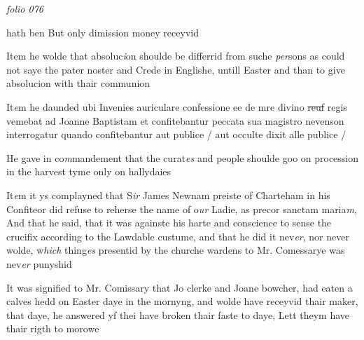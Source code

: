 \documentclass[12pt, a4paper]{book}
\begin{document}
\textit{folio 076}



	
		\ifthenelse{\isodd{\thepage}}
		{\reversemarginpar}
		{\normalmarginpar}
		hath ben But only dimission money receyvid
	
		\ifthenelse{\isodd{\thepage}}
		{\reversemarginpar}
		{\normalmarginpar}
		Item he wolde that absoluc\textit{i}on shoulde be differrid from
 suche \textit{per}sons as could not saye the pater noster and
 Crede in Englishe, untill Easter and than to give
 absolucion with thair communion


	
				\marginpar[\vspace{0.5cm}{\textcolor{Gray}{Confession}}]{}
			
	
		\ifthenelse{\isodd{\thepage}}
		{\reversemarginpar}
		{\normalmarginpar}
		It\textit{e}m he daunded ubi Invenies auriculare confessione
 ee de mre divino \sout{reuf} regis
			 vemebat ad Joanne Baptistam
 et confitebantur peccata sua magistro nevenson interrogatur
 quando confitebantur aut publice / aut occulte dixit
 alle publice /


	
		\ifthenelse{\isodd{\thepage}}
		{\reversemarginpar}
		{\normalmarginpar}
		He gave in co\textit{m}mandement that the curat\textit{es} and people
 shoulde goo on procession in the harvest tyme only
 on hallydaies

		\ifthenelse{\isodd{\thepage}}
		{\reversemarginpar}
		{\normalmarginpar}
		It\textit{e}m it ys complayned that S\textit{ir} James Newnam preiste
 of Charteham in his Confiteor did refuse to reherse
 the name of o\textit{ur} Ladie, as precor sanctam maria\textit{m}, And
 that he said, that it was againste his harte and
 conscience to sense the crucifix according to the
 Lawdable custume, and that he did it nev\textit{er}, nor
 never wolde, w\textit{hich} thing\textit{es} presentid by the churche
	wardens to Mr. Comessarye was nev\textit{er} punyshid
	
		\ifthenelse{\isodd{\thepage}}
		{\reversemarginpar}
		{\normalmarginpar}
		It was signified to Mr. Comissary that Jo clerke
		and Joane bowcher, had eaten a calves hedd on
 Easter daye in the mornyng, and wolde have
 receyvid thair maker, that daye, he answered
 yf thei have broken thair faste to daye, Lett
 theym have thair rigth to morowe




\dotfill
					
\end{document}
